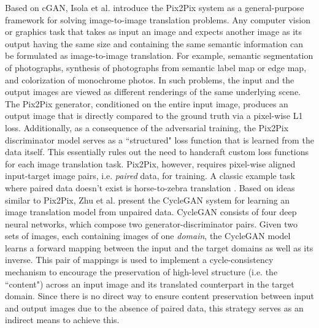 Based on cGAN, Isola et al. \cite{isola2017image} introduce the Pix2Pix system as a general-purpose framework for solving image-to-image translation problems. Any computer vision or graphics task that takes as input an image and expects another image as its output having the same size and containing the same semantic information can be formulated as image-to-image translation. For example, semantic segmentation of photographs, synthesis of photographs from semantic label map or edge map, and colorization of monochrome photos. In such problems, the input and the output images are viewed as different renderings of the same underlying scene. The Pix2Pix generator, conditioned on the entire input image, produces an output image that is directly compared to the ground truth via a pixel-wise L1 loss. Additionally, as a consequence of the adversarial training, the Pix2Pix discriminator model serves as a ``structured" loss function that is learned from the data itself. This essentially rules out the need to handcraft custom loss functions for each image translation task. Pix2Pix, however, requires pixel-wise aligned input-target image pairs, i.e. \textit{paired} data, for training. A classic example task where paired data doesn't exist is horse-to-zebra translation \cite{zhu2017unpaired}. Based on ideas similar to Pix2Pix, Zhu et al. present the CycleGAN system \cite{zhu2017unpaired} for learning an image translation model from unpaired data. CycleGAN consists of four deep neural networks, which compose two generator-discriminator pairs. Given two sets of images, each containing images of one \textit{domain}, the CycleGAN model learns a forward mapping between the input and the target domains as well as its inverse. This pair of mappings is used to implement a cycle-consistency mechanism to encourage the preservation of high-level structure (i.e. the ``content") across an input image and its translated counterpart in the target domain. Since there is no direct way to ensure content preservation between input and output images due to the absence of paired data, this strategy serves as an indirect means to achieve this.

